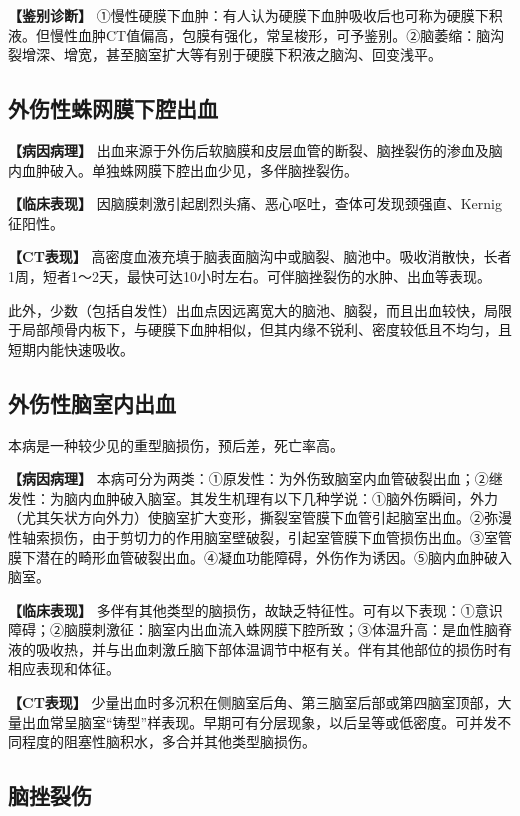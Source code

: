 \textbf{【鉴别诊断】}
①慢性硬膜下血肿：有人认为硬膜下血肿吸收后也可称为硬膜下积液。但慢性血肿CT值偏高，包膜有强化，常呈梭形，可予鉴别。②脑萎缩：脑沟裂增深、增宽，甚至脑室扩大等有别于硬膜下积液之脑沟、回变浅平。

\subsection{外伤性蛛网膜下腔出血}

\textbf{【病因病理】}
出血来源于外伤后软脑膜和皮层血管的断裂、脑挫裂伤的渗血及脑内血肿破入。单独蛛网膜下腔出血少见，多伴脑挫裂伤。

\textbf{【临床表现】}
因脑膜刺激引起剧烈头痛、恶心呕吐，查体可发现颈强直、Kernig征阳性。

\textbf{【CT表现】}
高密度血液充填于脑表面脑沟中或脑裂、脑池中。吸收消散快，长者1周，短者1～2天，最快可达10小时左右。可伴脑挫裂伤的水肿、出血等表现。

此外，少数（包括自发性）出血点因远离宽大的脑池、脑裂，而且出血较快，局限于局部颅骨内板下，与硬膜下血肿相似，但其内缘不锐利、密度较低且不均匀，且短期内能快速吸收。

\subsection{外伤性脑室内出血}

本病是一种较少见的重型脑损伤，预后差，死亡率高。

\textbf{【病因病理】}
本病可分为两类：①原发性：为外伤致脑室内血管破裂出血；②继发性：为脑内血肿破入脑室。其发生机理有以下几种学说：①脑外伤瞬间，外力（尤其矢状方向外力）使脑室扩大变形，撕裂室管膜下血管引起脑室出血。②弥漫性轴索损伤，由于剪切力的作用脑室壁破裂，引起室管膜下血管损伤出血。③室管膜下潜在的畸形血管破裂出血。④凝血功能障碍，外伤作为诱因。⑤脑内血肿破入脑室。

\textbf{【临床表现】}
多伴有其他类型的脑损伤，故缺乏特征性。可有以下表现：①意识障碍；②脑膜刺激征：脑室内出血流入蛛网膜下腔所致；③体温升高：是血性脑脊液的吸收热，并与出血刺激丘脑下部体温调节中枢有关。伴有其他部位的损伤时有相应表现和体征。

\textbf{【CT表现】}
少量出血时多沉积在侧脑室后角、第三脑室后部或第四脑室顶部，大量出血常呈脑室“铸型”样表现。早期可有分层现象，以后呈等或低密度。可并发不同程度的阻塞性脑积水，多合并其他类型脑损伤。

\subsection{脑挫裂伤}

